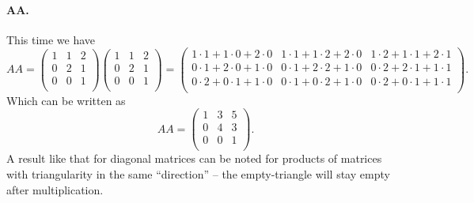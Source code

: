 \paragraph{AA.} This time we have
\[ 
A A = \begin{pmatrix}
1 & 1 & 2\\
0 & 2 & 1\\
0 & 0 & 1\\
\end{pmatrix} \begin{pmatrix}
1 & 1 & 2\\
0 & 2 & 1\\
0 & 0 & 1\\
\end{pmatrix} = \begin{pmatrix}
1 \cdot 1 + 1 \cdot 0 + 2 \cdot 0 & 1 \cdot 1 + 1 \cdot 2 + 2 \cdot 0 & 1 \cdot 2 + 1 \cdot 1 + 2 \cdot 1\\
0 \cdot  1 + 2 \cdot 0 + 1 \cdot 0 & 0 \cdot 1 + 2 \cdot 2 + 1 \cdot 0 & 0 \cdot 2 + 2 \cdot 1 + 1 \cdot 1\\
0 \cdot 2 + 0 \cdot 1 + 1 \cdot 0 & 0 \cdot 1 + 0 \cdot 2 + 1 \cdot 0 & 0 \cdot 2 + 0 \cdot 1 + 1 \cdot 1\\
\end{pmatrix}
.\]
Which can be written as
\[ 
A A = \begin{pmatrix}
1 & 3 & 5\\
0 & 4 & 3\\
0 & 0 & 1\\
\end{pmatrix}
.\]
A result like that for diagonal matrices can be noted for products of matrices with triangularity in the same ``direction'' -- the empty-triangle will stay empty after multiplication.


